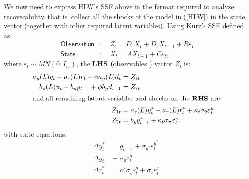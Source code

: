 \documentclass[12pt,a4paper]{article}
\let\oldref\ref
\renewcommand{\ref}[1]{(\oldref{#1})}
\newcommand{\intxt}[1]{\intertext{#1}}
\newcommand{\bsq}{\begin{subequations}}\newcommand{\esq}{\end{subequations}}
\begin{document}
We now need to express HLW's SSF above in the format required to analyze
recoverability, that is, collect all the shocks of the model in \ref{HLW} in
the state vector (together with other required latent variables). Using
Kurz's SSF defined as:\bsq\label{Kurz0}%
\begin{align}
\mathsf{Observation}& :\quad Z_{t}=D_{1}X_{t}+D_{2}X_{t-1}+R\varepsilon _{t}
\\
\mathsf{State}& :\quad X_{t}=AX_{t-1}+C\varepsilon _{t},
\end{align}%
\esq where $\varepsilon _{t}\sim MN(0,I_{m})$, the \textbf{LHS (}observables%
\={)} vector $Z_{t}$ is:\bsq\label{A}%
\begin{align}
a_{y}(L)y_{t}-a_{r}(L)r_{t}-\phi a_{y}(L)d_{t}& =Z_{1t} \\
b_{\pi }(L)\pi _{t}-b_{y}y_{t-1}+\phi b_{y}d_{t-1}& =Z_{2t} \\
\intxt{and all remaining latent variables and shocks on the \textbf{RHS}
are:}Z_{1t}& =a_{y}(L)y_{t}^{\ast }-a_{r}(L)r_{t}^{\ast }+\kappa _{t}\sigma
_{\tilde{y}}\varepsilon _{t}^{\tilde{y}} \\
Z_{2t}& =b_{y}y_{t-1}^{\ast }+\kappa _{t}\sigma _{\pi }\varepsilon _{t}^{\pi
},
\end{align}%
\esq with state equations:\bsq\label{AA}%
\begin{align}
\Delta y_{t}^{\ast }& =g_{t-1}+\sigma _{y^{\ast }}\varepsilon _{t}^{y^{\ast
}} \\
\Delta g_{t}& =\sigma _{g}\varepsilon _{t}^{g} \\
\Delta r_{t}^{\ast }& =c4\sigma _{g}\varepsilon _{t}^{g}+\sigma
_{z}\varepsilon _{t}^{z}.
\end{align}%
\esq
\end{document}

